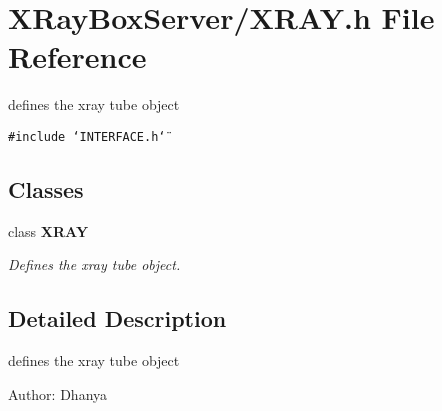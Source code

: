 \section{XRay\-Box\-Server/XRAY.h File Reference}
\label{XRAY_8h}
defines the xray tube object 

{\tt \#include \char`\"{}INTERFACE.h\char`\"{}}\par
\subsection*{Classes}
\begin{CompactItemize}
\item 
class \bf{XRAY}
\begin{CompactList}\small\item\em Defines the xray tube object. \item\end{CompactList}\end{CompactItemize}


\subsection{Detailed Description}
defines the xray tube object 

\begin{Desc}
\item[Author:]Dhanya \end{Desc}
